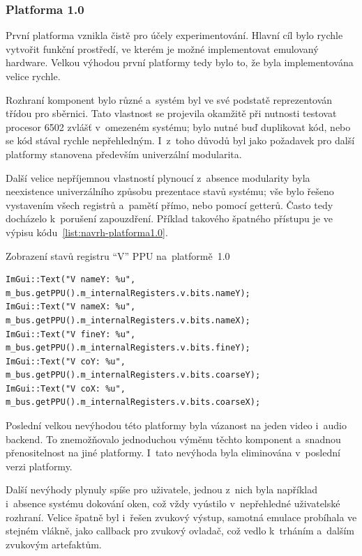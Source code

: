 \subsubsection{Platforma 1.0}
První platforma vznikla čistě pro účely experimentování. Hlavní cíl bylo rychle vytvořit funkční prostředí, ve kterém je možné implementovat emulovaný hardware. Velkou výhodou první platformy tedy bylo to, že byla implementována velice rychle.

Rozhraní komponent bylo různé a~systém byl ve své podstatě reprezentován třídou pro sběrnici. Tato vlastnost se projevila okamžitě při nutnosti testovat procesor 6502 zvlášť v~omezeném systému; bylo nutné buď duplikovat kód, nebo se kód stával rychle nepřehledným. I~z~toho důvodů byl jako požadavek pro další platformy stanovena především univerzální modularita.

Další velice nepříjemnou vlastností plynoucí z~absence modularity byla neexistence univerzálního způsobu prezentace stavů systému; vše bylo řešeno vystavením všech registrů a~pamětí přímo, nebo pomocí getterů. Často tedy docházelo k~porušení zapouzdření. Příklad takového špatného přístupu je ve výpisu kódu~\ref{list:navrh-platforma1.0}.

\begin{listing}
	\caption{Zobrazení stavů registru \enquote{V} PPU na~platformě~1.0}
	\label{list:navrh-platforma1.0}
	\begin{verbatim}
ImGui::Text("V nameY: %u", m_bus.getPPU().m_internalRegisters.v.bits.nameY);
ImGui::Text("V nameX: %u", m_bus.getPPU().m_internalRegisters.v.bits.nameX);
ImGui::Text("V fineY: %u", m_bus.getPPU().m_internalRegisters.v.bits.fineY);
ImGui::Text("V coY: %u",   m_bus.getPPU().m_internalRegisters.v.bits.coarseY);
ImGui::Text("V coX: %u",   m_bus.getPPU().m_internalRegisters.v.bits.coarseX);
	\end{verbatim}
\end{listing}

Poslední velkou nevýhodou této platformy byla vázanost na jeden video i~audio backend. To znemožňovalo jednoduchou výměnu těchto komponent a~snadnou přenositelnost na jiné platformy. I~tato nevýhoda byla eliminována v~poslední verzi platformy.

Další nevýhody plynuly spíše pro uživatele, jednou z~nich byla například i~absence systému dokování oken, což vždy vyústilo v~nepřehledné uživatelské rozhraní. Velice špatně byl i~řešen zvukový výstup, samotná emulace probíhala ve stejném vlákně, jako callback pro zvukový ovladač, což vedlo k~trháním a~dalším zvukovým artefaktům.

